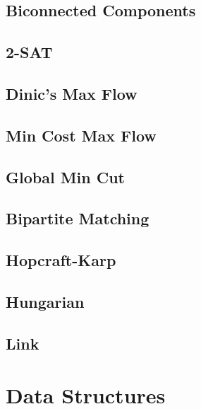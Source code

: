 \subsection{Biconnected Components}
\raggedbottom
\hrulefill
\subsection{2-SAT}
\raggedbottom
\hrulefill
\subsection{Dinic's Max Flow}
\raggedbottom
\hrulefill
\subsection{Min Cost Max Flow}
\raggedbottom
\hrulefill
\subsection{Global Min Cut}
\raggedbottom
\hrulefill
\subsection{Bipartite Matching}
\raggedbottom
\hrulefill
\subsection{Hopcraft-Karp}
\raggedbottom
\hrulefill
\subsection{Hungarian}
\raggedbottom
\hrulefill
\subsection{Link}
\raggedbottom
\hrulefill

\section{Data Structures}
